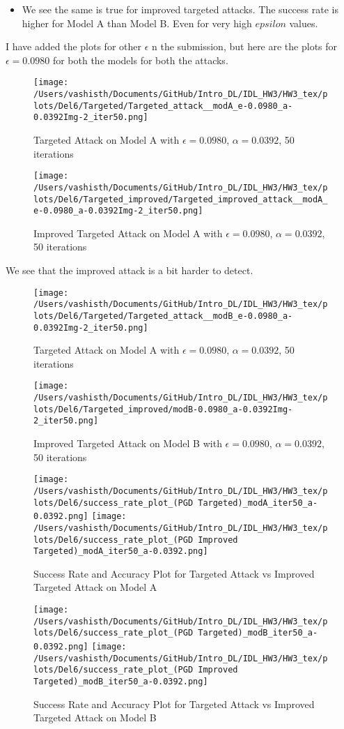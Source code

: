 \begin{solve}
\begin{itemize}
    \item We see the same is true for improved targeted attacks. The success rate is higher for Model A than Model B. Even for very high $epsilon$ values.
\end{itemize}


I have added the plots for other $\epsilon$ n the submission, but here are the plots for $\epsilon = 0.0980$ for both the models for both the attacks.

\begin{figure}[H]
    \centering
    \texttt{[image: /Users/vashisth/Documents/GitHub/Intro\_DL/IDL\_HW3/HW3\_tex/plots/Del6/Targeted/Targeted\_attack\_\_modA\_e-0.0980\_a-0.0392Img-2\_iter50.png]}
    \caption{Targeted Attack on Model A with $\epsilon = 0.0980$, $\alpha = 0.0392$, 50 iterations}
    \centering
    \texttt{[image: /Users/vashisth/Documents/GitHub/Intro\_DL/IDL\_HW3/HW3\_tex/plots/Del6/Targeted\_improved/Targeted\_improved\_attack\_\_modA\_e-0.0980\_a-0.0392Img-2\_iter50.png]}
    \caption{Improved Targeted Attack on Model A with $\epsilon = 0.0980$, $\alpha = 0.0392$, 50 iterations}
\end{figure}
We see that the improved attack is a bit harder to detect.

\begin{figure}[H]
    \centering
    \texttt{[image: /Users/vashisth/Documents/GitHub/Intro\_DL/IDL\_HW3/HW3\_tex/plots/Del6/Targeted/Targeted\_attack\_\_modB\_e-0.0980\_a-0.0392Img-2\_iter50.png]}
    \caption{Targeted Attack on Model A with $\epsilon = 0.0980$, $\alpha = 0.0392$, 50 iterations}
    \centering
    \texttt{[image: /Users/vashisth/Documents/GitHub/Intro\_DL/IDL\_HW3/HW3\_tex/plots/Del6/Targeted\_improved/modB-0.0980\_a-0.0392Img-2\_iter50.png]}
    \caption{Improved Targeted Attack on Model B with $\epsilon = 0.0980$, $\alpha = 0.0392$, 50 iterations}
\end{figure}



\begin{figure}[H]
    \centering
    \texttt{[image: /Users/vashisth/Documents/GitHub/Intro\_DL/IDL\_HW3/HW3\_tex/plots/Del6/success\_rate\_plot\_(PGD Targeted)\_modA\_iter50\_a-0.0392.png]}
    \texttt{[image: /Users/vashisth/Documents/GitHub/Intro\_DL/IDL\_HW3/HW3\_tex/plots/Del6/success\_rate\_plot\_(PGD Improved Targeted)\_modA\_iter50\_a-0.0392.png]}
    \caption{Success Rate and Accuracy Plot for Targeted Attack vs Improved Targeted Attack on Model A}
    \texttt{[image: /Users/vashisth/Documents/GitHub/Intro\_DL/IDL\_HW3/HW3\_tex/plots/Del6/success\_rate\_plot\_(PGD Targeted)\_modB\_iter50\_a-0.0392.png]}
    \texttt{[image: /Users/vashisth/Documents/GitHub/Intro\_DL/IDL\_HW3/HW3\_tex/plots/Del6/success\_rate\_plot\_(PGD Improved Targeted)\_modB\_iter50\_a-0.0392.png]}
    \caption{Success Rate and Accuracy Plot for Targeted Attack vs Improved Targeted Attack on Model B}
    \end{figure}
    

\end{solve}
